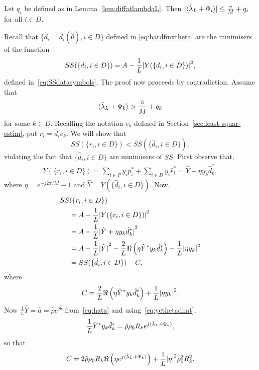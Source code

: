\documentclass[draftcls, onecolumn, 11pt]{IEEEtran}
\begin{document}
\begin{lemma}\label{lem:fracpartlambdahatnotpi} Let $q_i$ be defined as in Lemma~\ref{lem:diffatlambdaL}.  Then ${\vert \langle \hat{\lambda}_L + \Phi_i \rangle \vert} \leq \frac{\pi}{M} + q_i$ for all $i \in D$.
\end{lemma}
\begin{IEEEproof}
Recall that $\{\hat{d}_i = \hat{d}_i(\hat{\theta}), i \in D\}$ defined in \eqref{eq:hatdfinxtheta} are the minimisers of the function 
\[
SS(\{d_i, i \in D\}) = A - \frac{1}{L}{\vert Y(\{d_i, i \in D\}) \vert}^2,
\]
defined in~\eqref{eq:SSdatasymbols}. The proof now proceeds by contradiction.  Assume that 
\begin{equation}\label{eq:fraclambassumption}
\langle \hat{\lambda}_L + \Phi_k \rangle > \frac{\pi}{M} + q_k
\end{equation}
for some $k \in D$.  Recalling the notation $e_k$ defined in Section~\ref{sec:least-squar-estim}, put $r_i = \hat{d}_i e_k$.  We will show that 
\[
SS(\{r_i, i \in D\}) < SS(\{\hat{d}_i, i \in D\}),
\]
violating the fact that $\{\hat{d}_i, i \in D\}$ are minimisers of $SS$.  First observe that,
\begin{align*}
Y(\{ r_i, i \in D\}) = \sum_{i \in P} y_ip_i^* + \sum_{i \in D} y_i\hat{r}_i^* = \hat{Y} + \eta y_k\hat{d}_k^*,
\end{align*}
where $\eta = e^{-j2\pi/M} - 1$ and $\hat{Y} = Y(\{ \hat{d}_i, i \in D\})$.  Now,
\begin{align*}
SS&(\{r_i, i \in D\}) \\
&= A - \frac{1}{L} {\vert  Y(\{ r_i, i \in D\})  \vert}^2 \\
&= A - \frac{1}{L} {\vert  \hat{Y} + \eta y_k\hat{d}_k^*  \vert}^2 \\
&= A - \frac{1}{L}{\vert \hat{Y} \vert}^2 - \frac{2}{L}\Re\left(\eta \hat{Y}^* y_k \hat{d}_k^* \right) -  \frac{1}{L}{\vert  \eta y_k \vert}^2\\
&= SS(\{\hat{d}_i, i \in D\}) - C,
\end{align*}
where 
\[
C = \frac{2}{L}\Re\left(\eta \hat{Y}^* y_k \hat{d}_k^* \right) +  \frac{1}{L}{\vert  \eta y_k  \vert}^2.
\]
Now $\frac{1}{L}\hat{Y} = \hat{a} = \hat{\rho} e^{j\hat{\theta}}$ from~\eqref{eq:hata} and using~\eqref{eq:yethetadhat},
\[
\frac{1}{L} \hat{Y}^* y_k \hat{d}_k^* = \hat{\rho} \rho_0 R_k e^{j\langle \hat{\lambda}_L + \Phi_k \rangle},
\]
so that
\begin{equation}\label{eq:Ddefn}
C = 2 \hat{\rho} \rho_0 R_k \Re\left( \eta e^{j\langle \hat{\lambda}_L + \Phi_k \rangle}\right) + \frac{1}{L}{\vert \eta \vert}^2\rho_0^2 R_k^2.
\end{equation}

\end{IEEEproof}
\end{document}
